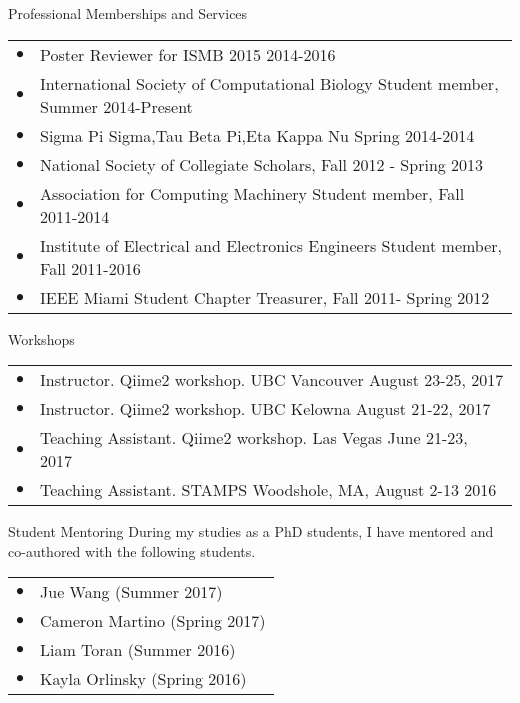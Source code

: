 \documentclass{resume} %
\begin{document}
\begin{rSection}{Professional Memberships and Services}
  \begin{tabular}{ll}
    $\bullet$ & Poster Reviewer for ISMB 2015  2014-2016\\
    $\bullet$ & International Society of Computational Biology Student member, Summer  2014-Present\\
    $\bullet$ & Sigma Pi Sigma,Tau Beta Pi,Eta Kappa Nu Spring 2014-2014 \\
    $\bullet$ & National Society of Collegiate Scholars, Fall 2012 - Spring 2013\\
    $\bullet$ & Association for Computing Machinery Student member, Fall  2011-2014 \\
    $\bullet$ & Institute of Electrical and Electronics Engineers Student member, Fall  2011-2016 \\
    $\bullet$ & IEEE Miami Student Chapter Treasurer, Fall 2011- Spring 2012\\
  \end{tabular}
\end{rSection}

\begin{rSection}{Workshops}
  \begin{tabular}{ll}
    $\bullet$ & Instructor. Qiime2 workshop. UBC Vancouver August 23-25, 2017 \\
    $\bullet$ & Instructor. Qiime2 workshop. UBC Kelowna August 21-22, 2017 \\
    $\bullet$ & Teaching Assistant. Qiime2 workshop.  Las Vegas June 21-23, 2017 \\
    $\bullet$ & Teaching Assistant. STAMPS
    Woodshole, MA, August 2-13 2016 \\
  \end{tabular}
\end{rSection}

\begin{rSection}{Student Mentoring}
  During my studies as a PhD students, I have mentored and co-authored with the following students.
  \begin{tabular}{ll}
    $\bullet$  &   Jue Wang (Summer 2017) \\
    $\bullet$  &   Cameron Martino (Spring 2017) \\
    $\bullet$  &   Liam Toran (Summer 2016)\\
    $\bullet$  &   Kayla Orlinsky (Spring 2016) \\
  \end{tabular}
\end{rSection}
\end{document}
